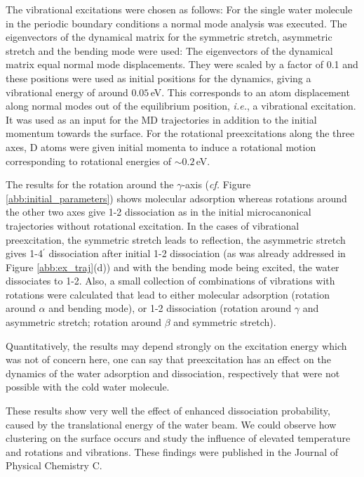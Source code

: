 \documentclass[11pt,DIV=13,BCOR=5mm,a4paper,headinclude]{scrbook}
\newcommand\todo[1]{\textcolor{red}{TODO: \textit{{#1}}}}
\begin{document}
The vibrational excitations were chosen as follows: For the single water molecule in the periodic boundary conditions a normal mode analysis was executed.
The eigenvectors of the dynamical matrix for the symmetric stretch, asymmetric stretch and the bending mode were used: The eigenvectors of the dynamical matrix equal normal mode displacements.
They were scaled by a factor of 0.1 and these positions were used as initial positions for the dynamics, giving a vibrational energy of around $0.05\,$eV. %
This corresponds to an atom displacement along normal modes out of the equilibrium position, \textit{i.e.}, a vibrational excitation.
It was used as an input for the MD trajectories in addition to the initial momentum towards the surface.
For the rotational preexcitations along the three axes, D atoms were given initial momenta to induce a rotational motion corresponding to rotational energies of $\sim 0.2\,$eV.


The results for the rotation around the $\gamma$-axis (\textit{cf.} Figure \ref{abb:initial_parameters}) shows molecular adsorption whereas rotations around the other two axes give 1-2 dissociation as in the initial microcanonical trajectories without rotational excitation.
In the cases of vibrational preexcitation, the symmetric stretch leads to reflection, the asymmetric stretch gives 1-4$^\prime$ dissociation after initial 1-2 dissociation (as was already addressed in Figure \ref{abb:ex_traj}(d)) and with the bending mode being excited, the water dissociates to 1-2.
Also, a small collection of combinations of vibrations with rotations were calculated that lead to either molecular adsorption (rotation around $\alpha$ and bending mode), or 1-2 dissociation (rotation around $\gamma$ and asymmetric stretch; rotation around $\beta$ and symmetric stretch).


Quantitatively, the results may depend strongly on the excitation energy which was not of concern here, one can say that preexcitation has an effect on the dynamics of the water adsorption and dissociation, respectively that were not possible with the cold water molecule.


These results show very well the effect of enhanced dissociation probability, caused by the translational energy of the water beam.
We could observe how clustering on the surface occurs and study the influence of elevated temperature and rotations and vibrations.
These findings were published in the Journal of Physical Chemistry C\cite{Heiden0001_2018}.
\end{document}
